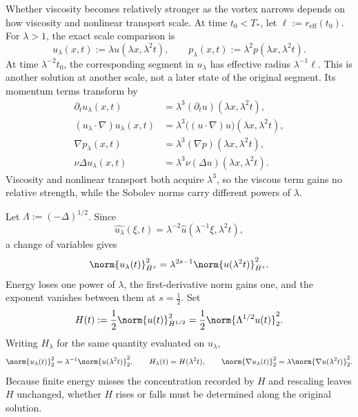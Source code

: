 
Whether viscosity becomes relatively stronger as the vortex narrows depends on how viscosity and nonlinear transport scale.
At time \(t_0<T_*\), let \(\ell:=r_{\mathrm{eff}}(t_0)\). For \(\lambda>1\), the exact scale comparison is
\[
  u_\lambda(x,t)
  :=
  \lambda u(\lambda x,\lambda^2t),
  \qquad
  p_\lambda(x,t)
  :=
  \lambda^2p(\lambda x,\lambda^2t).
\]
At time \(\lambda^{-2}t_0\), the corresponding segment in \(u_\lambda\) has effective radius \(\lambda^{-1}\ell\). This is another solution at another scale, not a later state of the original segment. Its momentum terms transform by
\[
\begin{aligned}
  \partial_tu_\lambda(x,t)
  &=
  \lambda^3(\partial_tu)(\lambda x,\lambda^2t),
  \\
  (u_\lambda\cdot\nabla)u_\lambda(x,t)
  &=
  \lambda^3\bigl((u\cdot\nabla)u\bigr)(\lambda x,\lambda^2t),
  \\
  \nabla p_\lambda(x,t)
  &=
  \lambda^3(\nabla p)(\lambda x,\lambda^2t),
  \\
  \nu\Delta u_\lambda(x,t)
  &=
  \lambda^3\nu(\Delta u)(\lambda x,\lambda^2t).
\end{aligned}
\]
Viscosity and nonlinear transport both acquire \(\lambda^3\), so the viscous term gains no relative strength, while the Sobolev norms carry different powers of \(\lambda\).


Let \(\Lambda:=(-\Delta)^{1/2}\). Since
\[
  \widehat{u_\lambda}(\xi,t)
  =
  \lambda^{-2}\widehat u(\lambda^{-1}\xi,\lambda^2t),
\]
a change of variables gives
\[
  \norm{u_\lambda(t)}_{\dot H^s}^2
  =
  \lambda^{2s-1}
  \norm{u(\lambda^2t)}_{\dot H^s}^2.
\]
Energy loses one power of \(\lambda\), the first-derivative norm gains one, and the exponent vanishes between them at \(s=\tfrac12\). Set
\[
  H(t)
  :=
  \frac12\norm{u(t)}_{\dot H^{1/2}}^2
  =
  \frac12\norm{\Lambda^{1/2}u(t)}_2^2.
\]
Writing \(H_\lambda\) for the same quantity evaluated on \(u_\lambda\),
\[
  \norm{u_\lambda(t)}_2^2
  =
  \lambda^{-1}\norm{u(\lambda^2t)}_2^2,
  \qquad
  H_\lambda(t)=H(\lambda^2t),
  \qquad
  \norm{\nabla u_\lambda(t)}_2^2
  =
  \lambda\norm{\nabla u(\lambda^2t)}_2^2.
\]
Because finite energy misses the concentration recorded by \(H\) and rescaling leaves \(H\) unchanged, whether \(H\) rises or falls must be determined along the original solution.


